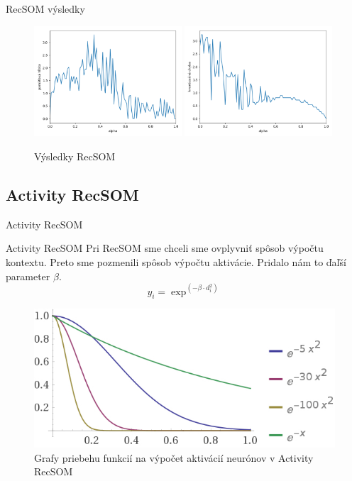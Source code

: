 \documentclass[10pt]{beamer}
\begin{document}
\begin{frame}[fragile]{RecSOM výsledky}
 \begin{figure}[H]
  \centering
  \includegraphics[width=0.49\textwidth]{assets/r_memory_span}
  \includegraphics[width=0.49\textwidth]{assets/r_errors}
  \caption{Výsledky RecSOM}
\end{figure}

\end{frame}

\subsection{Activity RecSOM}
\begin{frame}[fragile]{Activity RecSOM}

  \begin{block}{Activity RecSOM}
    Pri RecSOM sme chceli sme ovplyvniť
    spôsob výpočtu kontextu. Preto sme pozmenili spôsob výpočtu aktivácie.
    Pridalo nám to ďaľší parameter $\beta$.
    \begin{equation*}
      y_{i} = \exp^{(-\beta \cdot d_{i}^2)}
    \end{equation*}
  \end{block}

  \begin{figure}[H]
    \centering
    \includegraphics[width=\textwidth]{assets/plots}
    \caption{Grafy priebehu funkcií na výpočet aktivácií neurónov v Activity RecSOM}
\end{figure}

\end{frame}
\end{document}
